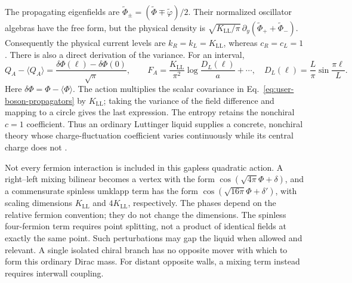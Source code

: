 \documentclass[aps,prb,onecolumn,nofootinbib,superscriptaddress]{revtex4-2}
\begin{document}
The propagating eigenfields are
$\widetilde\Phi_\pm=(\widetilde\Phi\mp\widetilde\varphi)/2$.
Their normalized oscillator algebras have the free form, but the physical
density is $\sqrt{K_{\mathrm{LL}}/\pi}\,
\partial_y(\widetilde\Phi_++\widetilde\Phi_-)$.
Consequently the physical current levels are
$k_R=k_L=K_{\mathrm{LL}}$, whereas $c_R=c_L=1$.
There is also a direct derivation of the variance. For an interval,
\begin{equation}
 Q_A-\langle Q_A\rangle
   =\frac{\delta\Phi(\ell)-\delta\Phi(0)}{\sqrt\pi},\qquad
 F_A=\frac{K_{\mathrm{LL}}}{\pi^2}
          \log\frac{D_L(\ell)}{a}+\cdots,
 \quad D_L(\ell)=\frac{L}{\pi}\sin\frac{\pi\ell}{L}.
 \label{eq:ll-variance}
\end{equation}
Here $\delta\Phi=\Phi-\langle\Phi\rangle$. The action multiplies the scalar covariance in
Eq.~\eqref{eq:user-boson-propagators} by $K_{\mathrm{LL}}$; taking
the variance of the field difference and mapping to a circle gives the
last expression. The entropy retains the nonchiral $c=1$ coefficient.
Thus an ordinary Luttinger liquid supplies a concrete, nonchiral theory
whose charge-fluctuation coefficient varies continuously while its
central charge does not \cite{SongRachelFlindtKlichLaflorencieLeHur2012}.

Not every fermion interaction is included in this gapless quadratic
action. A right--left mixing bilinear becomes a vertex with the form
$\cos(\sqrt{4\pi}\Phi+\delta)$, and a commensurate spinless umklapp
term has the form $\cos(\sqrt{16\pi}\Phi+\delta')$, with scaling
dimensions $K_{\mathrm{LL}}$ and $4K_{\mathrm{LL}}$, respectively.
The phases depend on the relative fermion convention; they do not change
the dimensions. The spinless four-fermion term requires point splitting,
not a product of identical fields at exactly the same point. Such
perturbations may gap the liquid when allowed and relevant. A single
isolated chiral branch has no opposite mover with which to form this
ordinary Dirac mass. For distant opposite walls, a mixing term instead
requires interwall coupling.
\end{document}
